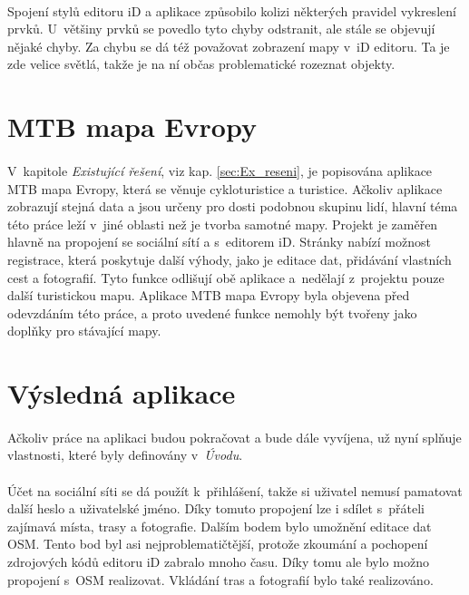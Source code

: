 \documentclass[11pt,a4paper,titlepage,oneside]{book}
\begin{document}
			\paragraph{} Spojení stylů editoru iD a aplikace způsobilo kolizi některých pravidel vykreslení prvků. U~většiny prvků se povedlo tyto chyby odstranit, ale stále se objevují nějaké chyby. Za chybu se dá též považovat zobrazení mapy v~iD editoru. Ta je zde velice světlá, takže je na ní občas problematické rozeznat objekty.


		\section{MTB mapa Evropy}



			\paragraph{} V~kapitole \textit{Existující řešení}, viz kap. \ref{sec:Ex_reseni}, je popisována aplikace MTB mapa Evropy, která se věnuje cykloturistice a turistice. Ačkoliv aplikace zobrazují stejná data a jsou určeny pro dosti podobnou skupinu lidí, hlavní téma této práce leží v~jiné oblasti než je tvorba samotné mapy. Projekt  je zaměřen hlavně na propojení se sociální sítí a s~editorem iD. Stránky  nabízí možnost registrace, která poskytuje další výhody, jako je editace dat, přidávání vlastních cest a fotografií. Tyto funkce odlišují obě aplikace a~nedělají z~projektu  pouze další turistickou mapu. Aplikace MTB mapa Evropy byla objevena před odevzdáním této práce, a proto uvedené funkce nemohly být tvořeny jako doplňky pro stávající mapy.

		\section{Výsledná aplikace}
			\paragraph{} Ačkoliv práce na aplikaci budou pokračovat a bude dále vyvíjena, už nyní splňuje vlastnosti, které byly definovány v~\textit{Úvodu}. 
			\paragraph {}Účet na sociální síti se dá použít k~přihlášení, takže si uživatel nemusí pamatovat další heslo a uživatelské jméno. Díky tomuto propojení lze i sdílet s~přáteli zajímavá místa, trasy a fotografie. Dalším bodem bylo umožnění editace dat \ac{OSM}. Tento bod byl asi nejproblematičtější, protože zkoumání a pochopení zdrojových kódů editoru iD zabralo mnoho času. Díky tomu ale bylo možno propojení s~\acl{OSM} realizovat. Vkládání tras a fotografií bylo také realizováno.
\end{document}
